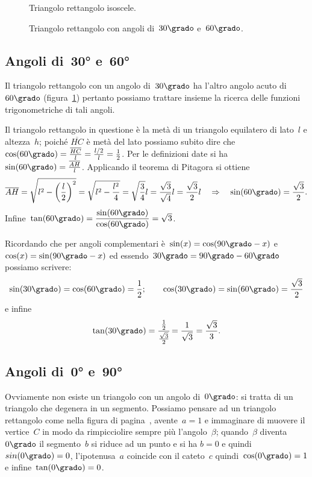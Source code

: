 \begin{figure}[t]
\begin{minipage}[t]{.45\textwidth}
 \centering
 
 \caption{Triangolo rettangolo isoscele.}\label{fig:G.1}
\end{minipage}\hfil
\begin{minipage}[t]{.45\textwidth}
 \centering
 
 \caption{Triangolo rettangolo con angoli di~$30\grado$ e~$60\grado$.}\label{fig:G.2}
\end{minipage}
\end{figure}

\subsection{Angoli di~30° e~60°}

Il triangolo rettangolo con un angolo di~$30\grado$ ha l'altro angolo acuto di~$60\grado$ (figura~\ref{fig:G.2}) pertanto possiamo trattare insieme
la ricerca delle funzioni trigonometriche di tali angoli.

Il triangolo rettangolo in questione è la metà di un triangolo equilatero di lato~$l$ e altezza~$h$; poiché $\overline{HC}$ è metà del lato
possiamo subito dire che~$\cos(60\grado)=\frac{\overline{HC}}{l}=\frac{l/2}{l}=\frac{1}{2}$.
Per le definizioni date si ha~$\sin(60\grado)=\frac{\overline{AH}}{l}$.
Applicando il teorema di Pitagora si ottiene
\[\overline{AH}=\sqrt{l^{2}-\left(\frac{l}{2}\right)^{2}}=\sqrt{l^2-\frac{l^2}{4}}=
\sqrt{\frac{3}{4}}l=\frac{\sqrt{3}}{\sqrt{4}}l=\frac{\sqrt{3}}{2}l
\quad\Rightarrow\quad\sin(60\grado)=\frac{\sqrt{3}}{2}.\]
Infine~$\tan(60\grado)=\dfrac{\sin(60\grado)}{\cos(60\grado)}=\sqrt{3}$.

Ricordando che per angoli complementari è~$\sin(x)=\cos(90\grado-x)$ e~$\cos(x)=\sin(90\grado-x)$
ed essendo~$30\grado=90\grado-60\grado$ possiamo scrivere:
\[\sin(30\grado)=\cos(60\grado)=\frac{1}{2};\qquad\cos(30\grado)=\sin(60\grado)=\frac{\sqrt{3}}{2}\]
e infine
\[\tan(30\grado)=\cfrac{\frac{1}{2}}{\frac{\sqrt{3}}{2}}=\frac{1}{\sqrt{3}}=\frac{\sqrt{3}}{3}.\]%

\subsection{Angoli di~0° e~90°}

Ovviamente non esiste un triangolo con un angolo di~$0\grado$: si tratta di un triangolo che degenera in un segmento.
Possiamo pensare ad un triangolo rettangolo come nella figura di pagina~\pageref{fig:triangolo_rettangolo}, avente~$a=1$ e immaginare di muovere il vertice~$C$ in modo da rimpicciolire
sempre più l'angolo~$\beta$; quando~$\beta$ diventa~$0\grado$ il segmento~$b$ si riduce ad un punto e si ha
$b=0$ e quindi~$sin(0\grado)=0$, l'ipotenusa~$a$ coincide con il cateto~$c$ quindi~$\cos(0\grado)=1$ e infine~$\tan(0\grado)=0$.

